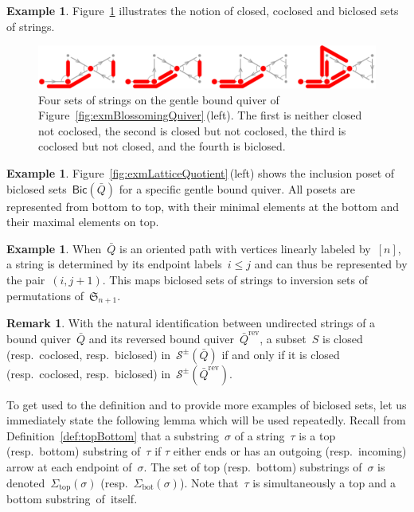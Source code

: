 \documentclass{memo-l}
\theoremstyle{definition}
\newtheorem{example}[theorem]{Example}
\newtheorem{remark}[theorem]{Remark}
\newcommand{\fS}{\mathfrak{S}} %
\newcommand{\fref}[1]{Figure~\ref{#1}} %
\newcommand{\strings}{\mathcal{S}} %
\newcommand{\reversed}[1]{#1^{\mathrm{rev}}} %
\renewcommand{\top}{\mathrm{top}} %
\newcommand{\bottom}{\mathrm{bot}} %
\newcommand{\Bicl}[1]{\mathsf{Bic}(#1)} %
\begin{document}
\begin{example}
\fref{fig:exmBiclosed} illustrates the notion of closed, coclosed and biclosed sets of strings.

\begin{figure}[h]
	\capstart
	\centerline{\includegraphics[scale=.45]{exmBiclosed}}
	\caption{Four sets of strings on the gentle bound quiver of \fref{fig:exmBlossomingQuiver}\,(left). The first is neither closed not coclosed, the second is closed but not coclosed, the third is coclosed but not closed, and the fourth is biclosed.}
	\label{fig:exmBiclosed}
\end{figure}
\end{example}

\begin{example}
\fref{fig:exmLatticeQuotient}\,(left) shows the inclusion poset of biclosed sets~$\Bicl{\bar Q}$ for a specific gentle bound quiver.
All posets are represented from bottom to top, with their minimal elements at the bottom and their maximal elements on top.
\end{example}

\begin{example}
When~$\bar Q$ is an oriented path with vertices linearly labeled by~$[n]$, a string is determined by its endpoint labels~$i \le j$ and can thus be represented by the pair~$(i,j+1)$.
This maps biclosed sets of strings to inversion sets of permutations of~$\fS_{n+1}$.
\end{example}

\begin{remark}
\label{rem:reverseBiclosed}
With the natural identification between undirected strings of a bound quiver~$\bar Q$ and its reversed bound quiver~$\reversed{\bar Q}$, a subset~$S$ is closed (resp.~coclosed, resp.~biclosed) in~$\strings^\pm(\bar Q)$ if and only if it is closed (resp.~coclosed, resp.~biclosed) in~$\strings^\pm(\reversed{\bar Q})$.
\end{remark}

To get used to the definition and to provide more examples of biclosed sets, let us immediately state the following lemma which will be used repeatedly.
Recall from Definition~\ref{def:topBottom} that a substring~$\sigma$ of a string~$\tau$ is a top (resp.~bottom) substring of~$\tau$ if $\tau$ either ends or has an outgoing (resp.~incoming) arrow at each endpoint of~$\sigma$.
The set of top (resp.~bottom) substrings of~$\sigma$ is denoted~$\Sigma_\top(\sigma)$ (resp.~$\Sigma_\bottom(\sigma)$).
Note that~$\tau$ is simultaneously a top and a bottom \mbox{substring of itself}.
\end{document}
